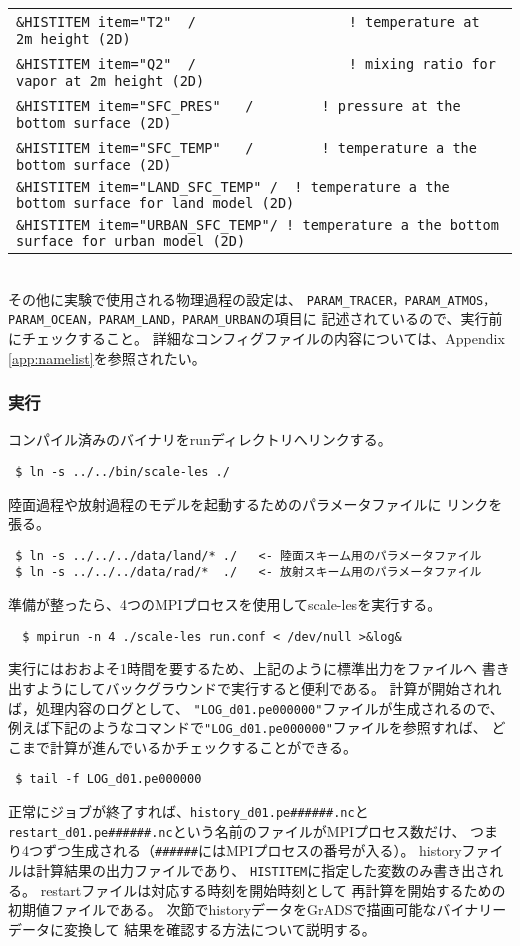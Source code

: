 {{{\begin{tabularx}{150mm}{l}
\verb|&HISTITEM item="T2"  / 　     　  　    　! temperature at 2m height (2D)| \\
\verb|&HISTITEM item="Q2"  / 　     　  　    　! mixing ratio for vapor at 2m height (2D)| \\
\verb|&HISTITEM item="SFC_PRES"   / 　    　! pressure at the bottom surface (2D)| \\
\verb|&HISTITEM item="SFC_TEMP"   / 　    　! temperature a the bottom surface (2D)| \\
\verb|&HISTITEM item="LAND_SFC_TEMP" /  ! temperature a the bottom surface for land model (2D)| \\
\verb|&HISTITEM item="URBAN_SFC_TEMP"/ ! temperature a the bottom surface for urban model (2D)| \\
\end{tabularx}
}}}\\

\noindent その他に実験で使用される物理過程の設定は、
\verb|PARAM_TRACER，PARAM_ATMOS，PARAM_OCEAN，PARAM_LAND，PARAM_URBAN|の項目に
記述されているので、実行前にチェックすること。
詳細なコンフィグファイルの内容については、Appendix \ref{app:namelist}を参照されたい。

%
\subsubsection{実行}
コンパイル済みのバイナリをrunディレクトリへリンクする。

\begin{verbatim}
 $ ln -s ../../bin/scale-les ./
\end{verbatim}
陸面過程や放射過程のモデルを起動するためのパラメータファイルに
リンクを張る。
\begin{verbatim}
 $ ln -s ../../../data/land/* ./   <- 陸面スキーム用のパラメータファイル
 $ ln -s ../../../data/rad/*  ./   <- 放射スキーム用のパラメータファイル
\end{verbatim}
準備が整ったら、4つのMPIプロセスを使用してscale-lesを実行する。
\begin{verbatim}
  $ mpirun -n 4 ./scale-les run.conf < /dev/null >&log&
\end{verbatim}

実行にはおおよそ1時間を要するため、上記のように標準出力をファイルへ
書き出すようにしてバックグラウンドで実行すると便利である。
計算が開始されれば，処理内容のログとして、
\verb|"LOG_d01.pe000000"|ファイルが生成されるので、
例えば下記のようなコマンドで\verb|"LOG_d01.pe000000"|ファイルを参照すれば、
どこまで計算が進んでいるかチェックすることができる。
\begin{verbatim}
 $ tail -f LOG_d01.pe000000
\end{verbatim}
正常にジョブが終了すれば、\verb|history_d01.pe######.nc|と
\verb|restart_d01.pe######.nc|という名前のファイルがMPIプロセス数だけ、
つまり4つずつ生成される（\verb|######|にはMPIプロセスの番号が入る）。
historyファイルは計算結果の出力ファイルであり、
\verb|HISTITEM|に指定した変数のみ書き出される。
restartファイルは対応する時刻を開始時刻として
再計算を開始するための初期値ファイルである。
次節でhistoryデータをGrADSで描画可能なバイナリーデータに変換して
結果を確認する方法について説明する。


